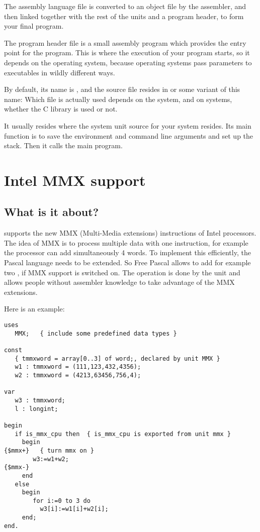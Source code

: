 The assembly language file is converted to an object file by the assembler,
and then linked together with the rest of the units and a program header, to
form your final program.

The program header file is a small assembly program which provides the entry
point for the program. This is where the execution of your program starts,
so it depends on the operating system, because operating systems pass
parameters to executables in wildly different ways.

By default, its name is , and the
source file resides in  or some variant of this name: Which
file is actually used depends on the system, and on \linux systems, whether
the C library is used or not.

It usually resides where the system unit source for your system resides.
Its main function is to save the environment and command line arguments 
and set up the stack. Then it calls the main program.

\chapter{Intel MMX support}
\label{ch:MMXSupport}

\section{What is it about?}
\label{se:WhatisMMXabout}
\fpc supports the new MMX (Multi-Media extensions)
instructions of Intel processors. The idea of MMX is to
process multiple data with one instruction, for example the processor
can add simultaneously 4 words. To implement this efficiently, the
Pascal language needs to be extended. So Free Pascal allows
to add for example two ,
if MMX support is switched on. The operation is done
by the  unit and allows people without assembler knowledge to take
advantage of the MMX extensions.

Here is an example:
\begin{verbatim}
uses
   MMX;   { include some predefined data types }

const
   { tmmxword = array[0..3] of word;, declared by unit MMX }
   w1 : tmmxword = (111,123,432,4356);
   w2 : tmmxword = (4213,63456,756,4);

var
   w3 : tmmxword;
   l : longint;

begin
   if is_mmx_cpu then  { is_mmx_cpu is exported from unit mmx }
     begin
{$mmx+}   { turn mmx on }
        w3:=w1+w2;
{$mmx-}
     end
   else
     begin
        for i:=0 to 3 do
          w3[i]:=w1[i]+w2[i];
     end;
end.
\end{verbatim}

